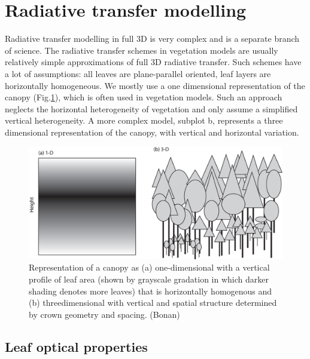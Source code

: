 \documentclass[
  12pt,
  oneside]{book}
\begin{document}
\hypertarget{radiative-transfer-modelling}{%
\section{Radiative transfer modelling}\label{radiative-transfer-modelling}}

Radiative transfer modelling in full 3D is very complex and is a separate branch of science. The radiative transfer schemes in vegetation models are usually relatively simple approximations of full 3D radiative transfer. Such schemes have a lot of assumptions: all leaves are plane-parallel oriented, leaf layers are horizontally homogeneous. We mostly use a one dimensional representation of the canopy (Fig.\ref{fig:f37}), which is often used in vegetation models. Such an approach neglects the horizontal heterogeneity of vegetation and only assume a simplified vertical heterogeneity. A more complex model, subplot b, represents a three dimensional representation of the canopy, with vertical and horizontal variation.

\begin{figure}

{\centering \includegraphics[width=0.8\linewidth]{figures/chap3/f37_RT_principle} 

}

\caption{Representation of a canopy as (a) one-dimensional with a vertical profile of leaf area (shown by grayscale gradation in which darker shading denotes more leaves) that is horizontally homogenous and (b) threedimensional with vertical and spatial structure determined by crown geometry and spacing. (Bonan)}\label{fig:f37}
\end{figure}

\hypertarget{leaf-optical-properties}{%
\subsection{Leaf optical properties}\label{leaf-optical-properties}}
\end{document}
